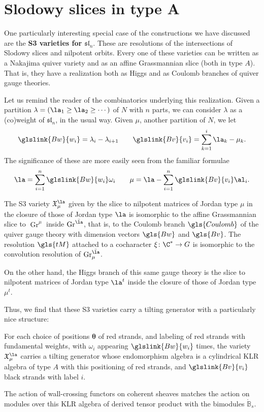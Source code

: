 \section{Slodowy slices in type A}

One particularly interesting special case of the constructions we have discussed are the {\bf S3 varieties for $\mathfrak{sl}_n$}.  These are resolutions of the intersections of Slodowy slices and nilpotent orbits.  Every one of these varieties can be written as a Nakajima quiver variety and as an affine Grassmannian slice (both in type $A$).  That is, they have a realization both as Higgs and as Coulomb branches of quiver gauge theories.  

Let us remind the reader of the combinatorics underlying this realization.  Given a partition $\lambda=(\la_1\geq \la_2\geq \cdots)$ of $N$ with $n$ parts, we can consider $\lambda$ as a (co)weight of $\mathfrak{sl}_n$, in the usual way.  Given $\mu$, another partition of $N$, 
we let \[\glslink{Bw}{w_i}=\lambda_i-\lambda_{i+1}\qquad \glslink{Bv}{v_i}=\sum_{k=1}^i \la_k-\mu_k.\]
The significance of these are more easily seen from the familiar formulae \[\la=\sum_{i=1}^n\glslink{Bw}{w_i}\omega_i\qquad \mu=\la-\sum_{i=1}^n\glslink{Bv}{v_i}\al_i.\]
\begin{theorem}
  The S3 variety $\mathfrak{X}^\la_\mu$ given by the slice to nilpotent matrices of Jordan type $\mu$ in the closure of those of Jordan type $\la$ is isomorphic to the affine Grassmannian slice to $\operatorname{Gr}^{\mu}$ inside $\operatorname{Gr}^{\bar \la}$, that is, to the Coulomb branch $
  \gls{Coulomb}$ of the quiver gauge theory with dimension vectors $\gls{Bw}$ and $\gls{Bv}$.   The resolution $\gls{tM}$ attached to a cocharacter $\xi \colon \C^*\to G$ is isomorphic to the convolution resolution of $\operatorname{Gr}^{\bar \la}_\mu$.  
\end{theorem}
On the other hand, the Higgs branch of this same gauge theory is the slice to nilpotent matrices of Jordan type $\la^t$  inside the closure of those of Jordan type  $\mu^t$. 

Thus, we find that these S3 varieties carry a tilting generator with a particularly nice structure:
\begin{theorem}
  For each choice of positions $\boldsymbol{\theta}$ of red strands, and labeling of red strands with fundamental weights, with $\omega_i$ appearing $\glslink{Bw}{w_i}$ times,
  the variety $\mathfrak{X}^\la_\mu$ carries a tilting generator whose endomorphism algebra is a cylindrical KLR algebra of type $A$ with this positioning of red strands, and $\glslink{Bv}{v_i}$ black strands with label $i$. 
  
  The action of wall-crossing functors on coherent sheaves matches the action on modules over this KLR algebra of derived tensor product with the bimodules $\mathbb{\mathring{B}}_{s}$.
\end{theorem}

